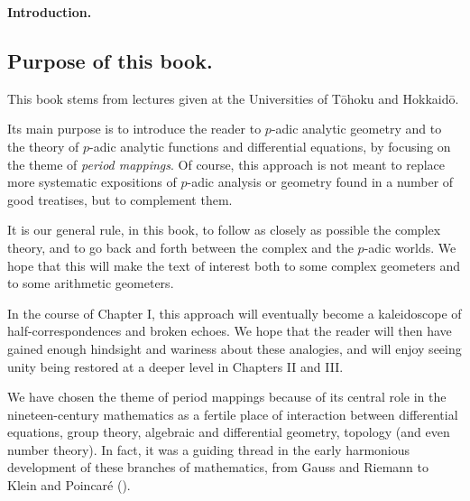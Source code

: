 
\begin{center}
 {\large\bf Introduction.}
\end{center}

\subsection*{Purpose of this book.}

This book stems from lectures given at the Universities of T\={o}hoku
and Hokkaid\={o}.  

Its main purpose is to introduce the reader to $p$-adic analytic
geometry and to the theory of $p$-adic analytic functions and
differential equations, by focusing on the theme of {\it period
mappings}. Of course, this approach is not meant to replace more
systematic expositions of $p$-adic analysis or geometry found in a
number of good treatises, but to complement them.

 It is our general rule, in this book, to follow as closely as possible
the complex theory, and to go back and forth between the complex and the
$p$-adic worlds. We hope that this will make the text of interest both
to some complex geometers and to some arithmetic geometers.

In the course of Chapter I, this approach will eventually become a
kaleidoscope of half-correspondences and broken echoes. We hope that the
reader will then have gained enough hindsight and wariness about these
analogies, and will enjoy seeing unity being restored at a deeper level
in Chapters II and III.

\bigskip

We have chosen the theme of period mappings because of its
central role in the nineteen-century mathematics as a fertile place of
interaction between differential equations, group theory, algebraic and
differential geometry, topology (and even number theory).  In fact, it
was a guiding thread in the early harmonious development of these
branches of mathematics, from Gauss and Riemann to Klein and Poincar\'e
(\cf [{\bf Gray86}]).

\bigskip

